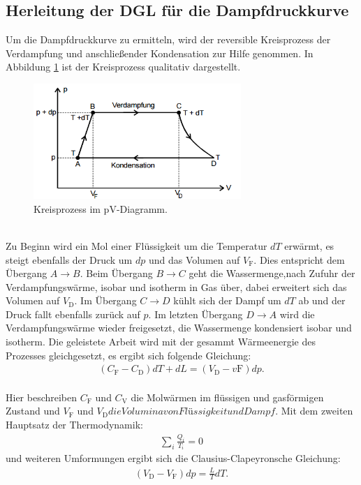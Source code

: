  \subsection{Herleitung der DGL für die Dampfdruckkurve}
Um die Dampfdruckkurve zu ermitteln, wird der reversible Kreisprozess der
Verdampfung und anschließender Kondensation zur Hilfe genommen.
In Abbildung \ref{fig:kreisprozess} ist der Kreisprozess qualitativ dargestellt.
\begin{figure}
 \centering
 \includegraphics[width=0.7\textwidth]{kreisprozess.png}
 \caption{Kreisprozess im pV-Diagramm. }
 \label{fig:kreisprozess}
 \end{figure}\\
Zu Beginn wird ein Mol einer Flüssigkeit um die Temperatur $dT$ erwärmt, es steigt ebenfalls
der Druck um $dp$ und das Volumen auf $V_\mathrm{F}$. Dies entspricht dem Übergang $A\longrightarrow B$.
Beim Übergang $B\longrightarrow C$ geht die Wassermenge,nach Zufuhr der Verdampfungswärme, isobar
und isotherm in Gas über, dabei erweitert sich das Volumen auf $V_\mathrm{D}$.
Im Übergang $C \longrightarrow D$ kühlt sich der Dampf um $dT$ ab und der Druck
fallt ebenfalls zurück auf $p$. Im letzten Übergang $D\longrightarrow A$ wird die
Verdampfungswärme wieder freigesetzt, die Wassermenge kondensiert isobar und isotherm.
Die geleistete Arbeit wird mit der gesammt Wärmeenergie des Prozesses gleichgesetzt,
es ergibt sich folgende Gleichung:
\begin{align}
(C_\mathrm{F}-C_\mathrm{D})dT+dL=(V_\mathrm{D}-v\mathrm{F})dp.
\end{align}\\
Hier beschreiben $C_\mathrm{F}$ und $C_\mathrm{V}$ die Molwärmen im flüssigen und
gasförmigen Zustand und $V_\mathrm{F}$ und $V_\mathrm{D} die Volumina von Flüssigkeit und Dampf$.
Mit dem zweiten Hauptsatz der Thermodynamik:
\begin{align}
\sum_{i}\frac{Q_i}{T_i}=0
\end{align}
und weiteren Umformungen ergibt sich die Clausius-Clapeyronsche Gleichung:
\begin{align}
(V_\mathrm{D}-V_\mathrm{F})dp=\frac{L}{T}dT\label{eqn:clausius}.
\end{align}
